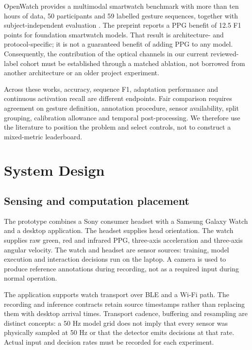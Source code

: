 OpenWatch provides a multimodal smartwatch benchmark with more than ten hours of data, 50 participants and 59 labelled gesture sequences, together with subject-independent evaluation \cite{openwatch}. The preprint reports a PPG benefit of 12.5 F1 points for foundation smartwatch models. That result is architecture- and protocol-specific; it is not a guaranteed benefit of adding PPG to any model. Consequently, the contribution of the optical channels in our current reviewed-label cohort must be established through a matched ablation, not borrowed from another architecture or an older project experiment.

Across these works, accuracy, sequence F1, adaptation performance and continuous activation recall are different endpoints. Fair comparison requires agreement on gesture definition, annotation procedure, sensor availability, split grouping, calibration allowance and temporal post-processing. We therefore use the literature to position the problem and select controls, not to construct a mixed-metric leaderboard.

\section{System Design}\label{system-design}

\subsection{Sensing and computation placement}\label{sensing-and-computation-placement}

The prototype combines a Sony consumer headset with a Samsung Galaxy Watch and a desktop application. The headset supplies head orientation. The watch supplies raw green, red and infrared PPG, three-axis acceleration and three-axis angular velocity. The watch and headset are sensor sources: training, model execution and interaction decisions run on the laptop. A camera is used to produce reference annotations during recording, not as a required input during normal operation.

The application supports watch transport over BLE and a Wi-Fi path. The recording and inference contracts retain source timestamps rather than replacing them with desktop arrival times. Transport cadence, buffering and resampling are distinct concepts: a 50 Hz model grid does not imply that every sensor was physically sampled at 50 Hz or that the detector emits decisions at that rate. Actual input and decision rates must be recorded for each experiment.

